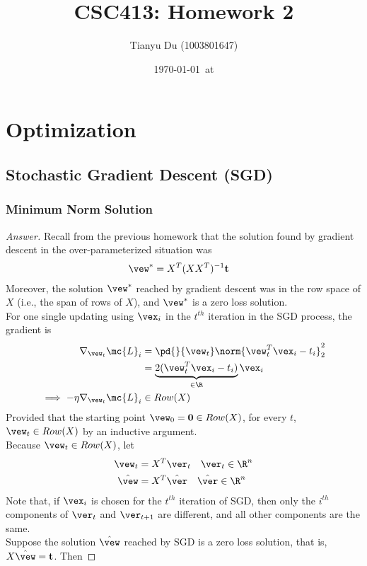 \documentclass{article}
\title{CSC413: Homework 2}
\date{\today\ at \currenttime}
\author{Tianyu Du (1003801647)}
\begin{document}
	\maketitle
	\section{Optimization}
	\subsection{Stochastic Gradient Descent (SGD)}
	\subsubsection{Minimum Norm Solution}
	\begin{proof}[Answer]
		Recall from the previous homework that the solution found by gradient descent in the over-parameterized situation was
		\begin{align}
			\vew^* &= X^T (XX^T)^{-1} \textbf{t}
		\end{align}
		Moreover, the solution $\vew^*$ reached by gradient descent was in the row space of $X$ (i.e., the span of rows of $X$), and $\vew^*$ is a zero loss solution. \\
		For one single updating using $\vex_i$ in the $t^{th}$ iteration in the SGD process, the gradient is
		\begin{align}
			\nabla_{\vew_t}{\mc{L}_i} &= \pd{}{\vew_t} \norm{\vew_t^T \vex_i - t_i}_2^2 \\
			&= \underbrace{2 (\vew_t^T \vex_i - t_i)}_{\in \R} \vex_i \\
			\implies - \eta \nabla_{\vew_t}{\mc{L}_i} &\in Row(X)
		\end{align}
		Provided that the starting point $\vew_0 = \textbf{0} \in Row(X)$, for every $t$, $\vew_t \in Row(X)$ by an inductive argument. \\
		Because $\vew_t \in Row(X)$, let 
		\begin{align}
			\vew_t &= X^T \ver_t\quad \ver_t \in \R^n \\
			\hat{\vew} &= X^T \hat{\ver}\quad \hat{\ver} \in \R^n
		\end{align}
		Note that, if $\vex_i$ is chosen for the $t^{th}$ iteration of SGD, then only the $i^{th}$ components of $\ver_t$ and $\ver_{t+1}$ are different, and all other components are the same. \\
		Suppose the solution $\hat{\vew}$ reached by SGD is a zero loss solution, that is, $X \hat{\vew} = \textbf{t}$. Then 

\end{proof}
\end{document}
